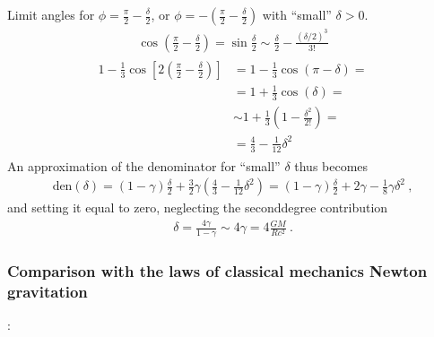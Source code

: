 \documentclass[letterpaper,10pt,english]{jupyterBook}
\begin{document}
\sphinxAtStartPar
Limit angles for \(\phi = \frac{\pi}{2} - \frac{\delta}{2}\), or \(\phi = - \left( \frac{\pi}{2} - \frac{\delta}{2} \right)\) with “small” \(\delta > 0\).
\begin{equation*}
\begin{split}\cos\left(\frac{\pi}{2} - \frac{\delta}{2} \right) = \sin \frac{\delta}{2} \sim \frac{\delta}{2} - \frac{\left(\delta/2\right)^3}{3!}\end{split}
\end{equation*}\begin{equation*}
\begin{split}\begin{aligned}
  1 - \frac{1}{3} \cos\left[ 2 \left(\frac{\pi}{2} - \frac{\delta}{2} \right) \right]
  & = 1 - \frac{1}{3} \cos \left( \pi - \delta \right) = \\
  & = 1 + \frac{1}{3} \cos(\delta) = \\
  & \sim 1 + \frac{1}{3} \left( 1 - \frac{\delta^2}{2!} \right) = \\
  & = \frac{4}{3} - \frac{1}{12}\delta^2
\end{aligned}\end{split}
\end{equation*}
\sphinxAtStartPar
An approximation of the denominator for “small” \(\delta\) thus becomes
\begin{equation*}
\begin{split}\text{den}(\delta) = \left( 1 - \gamma \right) \frac{\delta}{2} + \frac{3}{2} \gamma \left( \frac{4}{3} - \frac{1}{12} \delta^2 \right) = \left( 1 - \gamma \right) \frac{\delta}{2} + 2 \gamma - \frac{1}{8} \gamma \delta^2 \ , \end{split}
\end{equation*}
\sphinxAtStartPar
and setting it equal to zero, neglecting the second\sphinxhyphen{}degree contribution
\begin{equation}\label{equation:ch/relativity-general/rays-of-light-deflection:eq:rays-of-light-deflection:relativity}
\begin{split}\delta = \frac{4 \gamma}{1 - \gamma} \sim 4 \gamma = 4 \frac{GM}{R c^2 } \ .\end{split}
\end{equation}



\subsubsection{Comparison with the laws of classical mechanics \sphinxhyphen{} Newton gravitation}
\label{\detokenize{ch/relativity-general/rays-of-light-deflection:comparison-with-the-laws-of-classical-mechanics-newton-gravitation}}\label{\detokenize{ch/relativity-general/rays-of-light-deflection:relativity-general-notes-examples-deflection-of-ray-of-light-newton}}
\sphinxAtStartPar
{}: 
\end{document}
